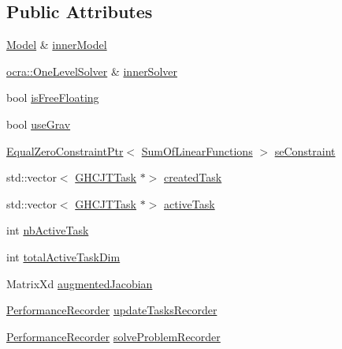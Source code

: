 \subsection*{Public Attributes}
\begin{DoxyCompactItemize}
\item 
\hyperlink{classocra_1_1Model}{Model} \& \hyperlink{structgocra_1_1GHCJTController_1_1Pimpl_a43eb79ddf7ef332d76d850711fc57e8e}{inner\+Model}
\item 
\hyperlink{classocra_1_1OneLevelSolver}{ocra\+::\+One\+Level\+Solver} \& \hyperlink{structgocra_1_1GHCJTController_1_1Pimpl_af06224d9d2a704cb042b5b01d3bf18ab}{inner\+Solver}
\item 
bool \hyperlink{structgocra_1_1GHCJTController_1_1Pimpl_a04bbff0e011a7c0b2bff47c08ed32993}{is\+Free\+Floating}
\item 
bool \hyperlink{structgocra_1_1GHCJTController_1_1Pimpl_a0a9b1d16fc029929004e00dbf358063a}{use\+Grav}
\item 
\hyperlink{classocra_1_1EqualZeroConstraintPtr}{Equal\+Zero\+Constraint\+Ptr}$<$ \hyperlink{classocra_1_1SumOfLinearFunctions}{Sum\+Of\+Linear\+Functions} $>$ \hyperlink{structgocra_1_1GHCJTController_1_1Pimpl_abbc7f37d47e968b025652ade01739ab8}{se\+Constraint}
\item 
std\+::vector$<$ \hyperlink{classgocra_1_1GHCJTTask}{G\+H\+C\+J\+T\+Task} $\ast$$>$ \hyperlink{structgocra_1_1GHCJTController_1_1Pimpl_ae336064c9007227c37ec24f455b4cc39}{created\+Task}
\item 
std\+::vector$<$ \hyperlink{classgocra_1_1GHCJTTask}{G\+H\+C\+J\+T\+Task} $\ast$$>$ \hyperlink{structgocra_1_1GHCJTController_1_1Pimpl_a2322f7612c4ee994869b897d6546da97}{active\+Task}
\item 
int \hyperlink{structgocra_1_1GHCJTController_1_1Pimpl_acc8e0872a4a56af752e5556f8b5c83d5}{nb\+Active\+Task}
\item 
int \hyperlink{structgocra_1_1GHCJTController_1_1Pimpl_a9814826f2b30accde751b9f343b3590b}{total\+Active\+Task\+Dim}
\item 
Matrix\+Xd \hyperlink{structgocra_1_1GHCJTController_1_1Pimpl_a9ebc2b951dfa979568dfe12a36124424}{augmented\+Jacobian}
\item 
\hyperlink{classgocra_1_1PerformanceRecorder}{Performance\+Recorder} \hyperlink{structgocra_1_1GHCJTController_1_1Pimpl_a7305b9fe096cfd38ba50af0797484a6a}{update\+Tasks\+Recorder}
\item 
\hyperlink{classgocra_1_1PerformanceRecorder}{Performance\+Recorder} \hyperlink{structgocra_1_1GHCJTController_1_1Pimpl_a949ca96a7b5a333e0594c6e6eda106a1}{solve\+Problem\+Recorder}
\end{DoxyCompactItemize}


